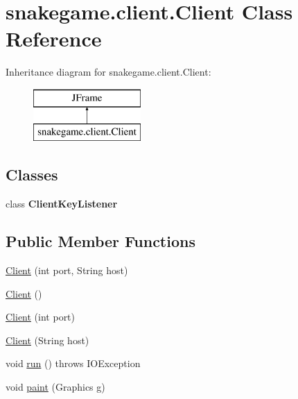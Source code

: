 \hypertarget{classsnakegame_1_1client_1_1_client}{}\section{snakegame.\+client.\+Client Class Reference}
\label{classsnakegame_1_1client_1_1_client}
Inheritance diagram for snakegame.\+client.\+Client\+:\begin{figure}[H]
\begin{center}
\leavevmode
\includegraphics[height=2.000000cm]{classsnakegame_1_1client_1_1_client}
\end{center}
\end{figure}
\subsection*{Classes}
\begin{DoxyCompactItemize}
\item 
class {\bfseries Client\+Key\+Listener}
\end{DoxyCompactItemize}
\subsection*{Public Member Functions}
\begin{DoxyCompactItemize}
\item 
\mbox{\hyperlink{classsnakegame_1_1client_1_1_client_a1d9ca3c932bb8594efdfc6facb33d90c}{Client}} (int port, String host)
\item 
\mbox{\hyperlink{classsnakegame_1_1client_1_1_client_a535018f1c145ab1ea9949f231b39bd42}{Client}} ()
\item 
\mbox{\hyperlink{classsnakegame_1_1client_1_1_client_a4165aaf5d9c01f9b4b9416ea5a60c84d}{Client}} (int port)
\item 
\mbox{\hyperlink{classsnakegame_1_1client_1_1_client_ac6777539a79418c36d55da33dc3451c5}{Client}} (String host)
\item 
void \mbox{\hyperlink{classsnakegame_1_1client_1_1_client_a4c8965e3e5776858c2c44bfba1fc0554}{run}} ()  throws I\+O\+Exception 
\item 
void \mbox{\hyperlink{classsnakegame_1_1client_1_1_client_a1e984a95002244e56d80be35396bf80e}{paint}} (Graphics g)
\end{DoxyCompactItemize}

